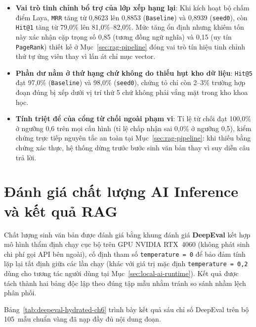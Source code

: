 \begin{itemize}
\item[--] \textbf{Vai trò tinh chỉnh bổ trợ của lớp xếp hạng lại}: Khi kích hoạt bộ chấm điểm Laya, \texttt{MRR} tăng từ 0,8623 lên 0,8853 (\texttt{Baseline}) và 0,8939 (\texttt{seed0}), còn \texttt{Hit@1} tăng từ 79,0\% lên 81,0\%--82,0\%. Mức tăng ổn định nhưng khiêm tốn này xác nhận cặp trọng số 0,85 (tương đồng ngữ nghĩa) và 0,15 (uy tín \texttt{PageRank}) thiết kế ở Mục~\ref{sec:rag-pipeline} đóng vai trò tín hiệu tinh chỉnh thứ tự ứng viên thay vì lấn át chỉ mục vector.
\item[--] \textbf{Phần dư nằm ở thứ hạng chứ không do thiếu hụt kho dữ liệu}: \texttt{Hit@5} đạt 97,0\% (\texttt{Baseline}) và 98,0\% (\texttt{seed0}), chứng tỏ chỉ còn 2--3\% trường hợp đoạn đúng bị xếp dưới vị trí thứ 5 chứ không phải vắng mặt trong kho khoa học.
\item[--] \textbf{Tính triệt để của cổng từ chối ngoài phạm vi}: Tỉ lệ từ chối đạt 100,0\% ở ngưỡng 0,6 trên mọi cấu hình (tỉ lệ chấp nhận sai 0,0\% ở ngưỡng 0,5), kiểm chứng trực tiếp nguyên tắc an toàn tại Mục~\ref{sec:rag-pipeline}: khi thiếu bằng chứng xác thực, hệ thống dừng trước bước sinh văn bản thay vì suy diễn câu trả lời.
\end{itemize}

\section{Đánh giá chất lượng AI Inference và kết quả RAG}
\label{sec:danh-gia-rag}

Chất lượng sinh văn bản được đánh giá bằng khung đánh giá \textbf{DeepEval} kết hợp mô hình thẩm định chạy cục bộ trên GPU NVIDIA RTX~4060 (không phát sinh chi phí gọi API bên ngoài), cố định tham số \texttt{temperature = 0} để bảo đảm tính lặp lại tất định giữa các lần chạy (khác với giá trị mặc định \texttt{temperature = 0,2} dùng cho tương tác người dùng tại Mục~\ref{sec:local-ai-runtime}). Kết quả được tách thành hai bảng độc lập theo đúng tập mẫu nhằm tránh so sánh nhầm lệch phân phối.

Bảng~\ref{tab:deepeval-hydrated-ch6} trình bày kết quả sáu chỉ số DeepEval trên bộ 105~mẫu chuẩn vàng đã nạp đầy đủ nội dung đoạn.

